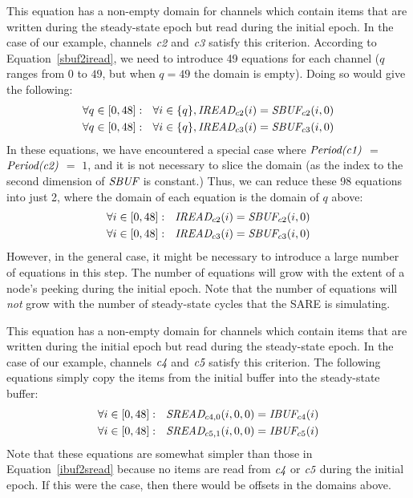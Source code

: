 This equation has a non-empty domain for channels which contain items
that are written during the steady-state epoch but read during the
initial epoch.  In the case of our example, channels $\mbox{\it c2}$ and
$\mbox{\it c3}$ satisfy this criterion.  According to
Equation~\ref{sbuf2iread}, we need to introduce 49 equations for
each channel ($q$ ranges from $0$ to $49$, but when $q = 49$ the
domain is empty).  Doing so would give the following:
\begin{align*}
\forall q \in [0, 48]:~~\forall i \in \{q\}, \mbox{\it IREAD}_{c2}(i) &= \mbox{\it SBUF}_{c2}(i, 0) \\
\forall q \in [0, 48]:~~\forall i \in \{q\}, \mbox{\it IREAD}_{c3}(i) &= \mbox{\it SBUF}_{c3}(i, 0)
\end{align*}
In these equations, we have encountered a special case where
$\mbox{\it Period(c1)}$ $=$ $\mbox{\it Period(c2)}$ $=$ $1$, and it is not
necessary to slice the domain (as the index to the second dimension of
$\mbox{\it SBUF}$ is constant.)  Thus, we can reduce these 98 equations into
just 2, where the domain of each equation is the domain of $q$ above:
\begin{align*}
\forall i \in [0, 48]:~~\mbox{\it IREAD}_{c2}(i) &= \mbox{\it SBUF}_{c2}(i, 0) \\
\forall i \in [0, 48]:~~\mbox{\it IREAD}_{c3}(i) &= \mbox{\it SBUF}_{c3}(i, 0)
\end{align*}
However, in the general case, it might be necessary to introduce a
large number of equations in this step.  The number of equations will
grow with the extent of a node's peeking during the initial epoch.
Note that the number of equations will {\it not} grow with the number
of steady-state cycles that the SARE is simulating.


This equation has a non-empty domain for channels which contain items
that are written during the initial epoch but read during the
steady-state epoch.  In the case of our example, channels $\mbox{\it c4}$
and $\mbox{\it c5}$ satisfy this criterion.  The following equations
simply copy the items from the initial buffer into the steady-state
buffer:
\begin{align*}
\forall i \in [0, 48]:~~\mbox{\it SREAD}_{{c4}, 0}(i,0,0) &= \mbox{\it IBUF}_{c4}(i) \\
\forall i \in [0, 48]:~~\mbox{\it SREAD}_{{c5}, 1}(i,0,0) &= \mbox{\it IBUF}_{c5}(i) 
\end{align*}
Note that these equations are somewhat simpler than those in
Equation~\ref{ibuf2sread} because no items are read from
$\mbox{\it c4}$ or $\mbox{\it c5}$ during the initial epoch.  If this were the
case, then there would be offsets in the domains above.

